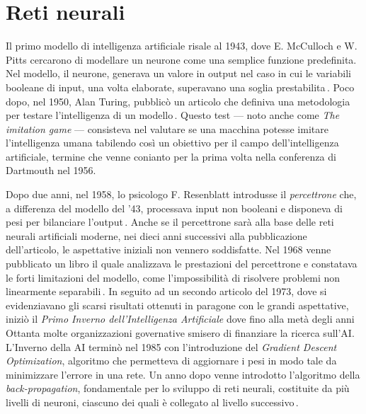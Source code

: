 
\chapter{Reti neurali}\label{chp:neural-networks}
% 
Il primo modello di intelligenza artificiale risale al 1943, dove E. McCulloch e W. Pitts cercarono di modellare un neurone come una semplice funzione predefinita. Nel modello, il neurone, generava un valore in output nel caso in cui le variabili booleane di input, una volta elaborate, superavano una soglia prestabilita\,\cite[``A logical calculus of the ideas immanent in nervous activity'']{mcculloch1943logical}. Poco dopo, nel 1950, Alan Turing, pubblicò un articolo che definiva una metodologia per testare l'intelligenza di un modello\,\cite[``Computing machinery and intelligence'']{turing2009computing}. Questo test — noto anche come \textsl{The imitation game} — consisteva nel valutare se una macchina potesse imitare l'intelligenza umana tabilendo così un obiettivo per il campo dell'intelligenza artificiale, termine che venne conianto per la prima volta nella conferenza di Dartmouth nel 1956.

Dopo due anni, nel 1958, lo psicologo F. Resenblatt introdusse il \textsl{percettrone} che, a differenza del modello del '43, processava input non booleani e disponeva di pesi per bilanciare l'output\,\cite[``The perceptron: a probabilistic model for information storage and organization in the brain.'']{rosenblatt1958perceptron}. Anche se il percettrone sarà alla base delle reti neurali artificiali moderne, nei dieci anni successivi alla pubblicazione dell'articolo, le aspettative iniziali non vennero soddisfatte. Nel 1968 venne pubblicato un libro il quale analizzava le prestazioni del percettrone e constatava le forti limitazioni del modello, come l'impossibilità di risolvere problemi non linearmente separabili\,\cite[``Perceptrons'']{minsky2017perceptrons}. In seguito ad un secondo articolo del 1973, dove si evidenziavano gli scarsi risultati ottenuti in paragone con le grandi aspettative, iniziò il \textsl{Primo Inverno dell'Intelligenza Artificiale} dove fino alla metà degli anni Ottanta molte organizzazioni governative smisero di finanziare la ricerca sull'\ac{AI}. L'Inverno della \ac{AI} terminò nel 1985 con l'introduzione del \textit{Gradient Descent Optimization}, algoritmo che permetteva di aggiornare i pesi in modo tale da minimizzare l'errore in una rete. Un anno dopo venne introdotto l'algoritmo della \textit{back-propagation}, fondamentale per lo sviluppo di reti neurali, costituite da più livelli di neuroni, ciascuno dei quali è collegato al livello successivo\,\cite[``Learning representations by back-propagating errors'']{rumelhart1986learning}.

